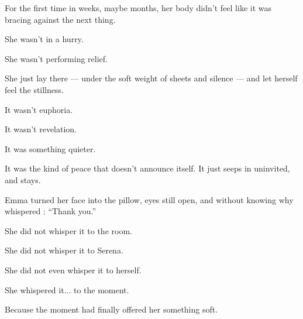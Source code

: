 For the first time in weeks, maybe months, her body didn’t feel like it was bracing against the 
next thing.

She wasn’t in a hurry.

She wasn’t performing relief.

She just lay there --- under the soft weight of sheets and silence --- and let herself feel the 
stillness.

It wasn’t euphoria.

It wasn’t revelation.

It was something quieter.

It was the kind of peace that doesn’t announce itself. It just seeps in uninvited, and stays.

Emma turned her face into the pillow, eyes still open, and without knowing why whispered
: ``Thank you.''

She did not whisper it to the room.

She did not whisper it to Serena.

She did not even whisper it to herself.

She whispered it... to the moment.

Because the moment had finally offered her something soft.

\medskip 

